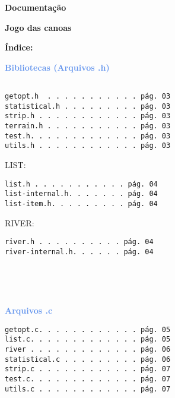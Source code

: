 \documentclass[a4paper,12pt]{article}
\begin{document}
\begin{center} 
  {\Huge \textcolor{NavyBlue}{ \textbf{Documentação}}}
\end{center}

\bigskip
\bigskip
\bigskip



\begin{center} 
  {\Huge \textcolor{NavyBlue}{ \textbf{Jogo das canoas}}}
\end{center}


\newpage %

{\LARGE \textcolor{NavyBlue}{ \textbf{Índice:}}}
\bigskip
\bigskip
\bigskip

{\large \textcolor{CornflowerBlue}{\textbf{Bibliotecas (Arquivos .h)}}}
\begin{verbatim}

getopt.h  . . . . . . . . . . . pág. 03
statistical.h . . . . . . . . . pág. 03
strip.h . . . . . . . . . . . . pág. 03
terrain.h . . . . . . . . . . . pág. 03
test.h. . . . . . . . . . . . . pág. 03
utils.h . . . . . . . . . . . . pág. 03

\end{verbatim}

{\textcolor{NavyBlue}{ LIST: }}
\begin{verbatim}
list.h . . . . . . . . . . . pág. 04
list-internal.h. . . . . . . pág. 04
list-item.h. . . . . . . . . pág. 04

\end{verbatim}

{\textcolor{NavyBlue}{RIVER:}}
\begin{verbatim}
river.h . . . . . . . . . . pág. 04
river-internal.h. . . . . . pág. 04





\end{verbatim}

{\large \textcolor{CornflowerBlue}{\textbf{Arquivos .c}}}
\begin{verbatim}
getopt.c. . . . . . . . . . . . pág. 05
list.c. . . . . . . . . . . . . pág. 05
river . . . . . . . . . . . . . pág. 06
statistical.c . . . . . . . . . pág. 06
strip.c . . . . . . . . . . . . pág. 07
test.c. . . . . . . . . . . . . pág. 07
utils.c . . . . . . . . . . . . pág. 07
\end{verbatim}


\newpage %
\end{document}
